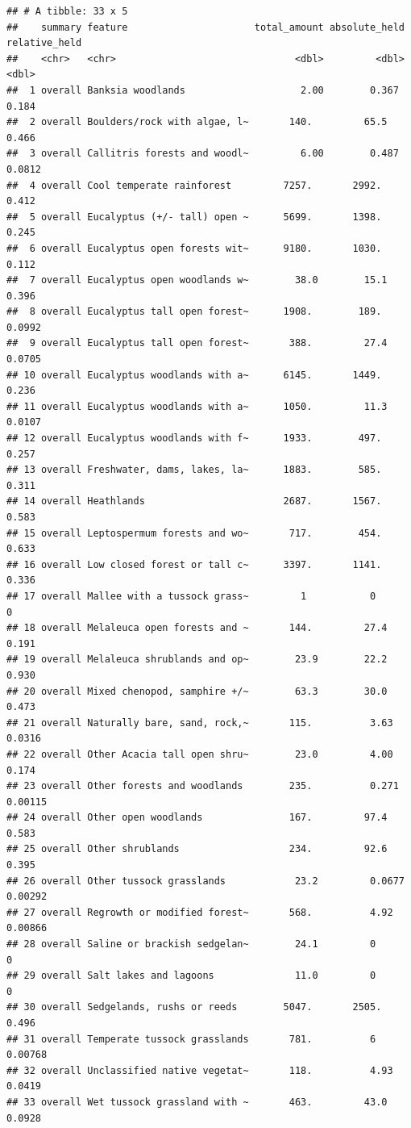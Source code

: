 \documentclass[
  12pt,
]{book}
\begin{document}
\begin{verbatim}
## # A tibble: 33 x 5
##    summary feature                      total_amount absolute_held relative_held
##    <chr>   <chr>                               <dbl>         <dbl>         <dbl>
##  1 overall Banksia woodlands                    2.00        0.367        0.184  
##  2 overall Boulders/rock with algae, l~       140.         65.5          0.466  
##  3 overall Callitris forests and woodl~         6.00        0.487        0.0812 
##  4 overall Cool temperate rainforest         7257.       2992.           0.412  
##  5 overall Eucalyptus (+/- tall) open ~      5699.       1398.           0.245  
##  6 overall Eucalyptus open forests wit~      9180.       1030.           0.112  
##  7 overall Eucalyptus open woodlands w~        38.0        15.1          0.396  
##  8 overall Eucalyptus tall open forest~      1908.        189.           0.0992 
##  9 overall Eucalyptus tall open forest~       388.         27.4          0.0705 
## 10 overall Eucalyptus woodlands with a~      6145.       1449.           0.236  
## 11 overall Eucalyptus woodlands with a~      1050.         11.3          0.0107 
## 12 overall Eucalyptus woodlands with f~      1933.        497.           0.257  
## 13 overall Freshwater, dams, lakes, la~      1883.        585.           0.311  
## 14 overall Heathlands                        2687.       1567.           0.583  
## 15 overall Leptospermum forests and wo~       717.        454.           0.633  
## 16 overall Low closed forest or tall c~      3397.       1141.           0.336  
## 17 overall Mallee with a tussock grass~         1           0            0      
## 18 overall Melaleuca open forests and ~       144.         27.4          0.191  
## 19 overall Melaleuca shrublands and op~        23.9        22.2          0.930  
## 20 overall Mixed chenopod, samphire +/~        63.3        30.0          0.473  
## 21 overall Naturally bare, sand, rock,~       115.          3.63         0.0316 
## 22 overall Other Acacia tall open shru~        23.0         4.00         0.174  
## 23 overall Other forests and woodlands        235.          0.271        0.00115
## 24 overall Other open woodlands               167.         97.4          0.583  
## 25 overall Other shrublands                   234.         92.6          0.395  
## 26 overall Other tussock grasslands            23.2         0.0677       0.00292
## 27 overall Regrowth or modified forest~       568.          4.92         0.00866
## 28 overall Saline or brackish sedgelan~        24.1         0            0      
## 29 overall Salt lakes and lagoons              11.0         0            0      
## 30 overall Sedgelands, rushs or reeds        5047.       2505.           0.496  
## 31 overall Temperate tussock grasslands       781.          6            0.00768
## 32 overall Unclassified native vegetat~       118.          4.93         0.0419 
## 33 overall Wet tussock grassland with ~       463.         43.0          0.0928
\end{verbatim}
\end{document}

